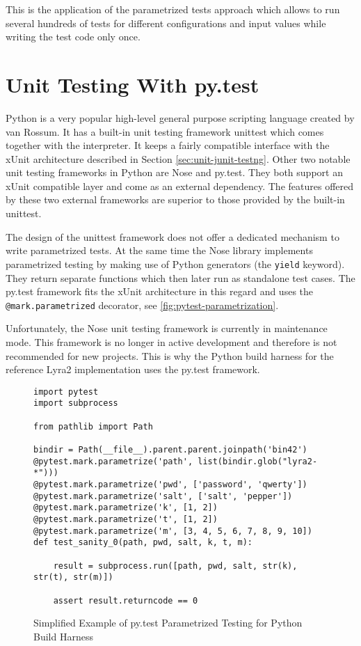 This is the application of the parametrized tests approach which allows to run several hundreds of tests for different configurations and input values while writing the test code only once.

\section{Unit Testing With py.test}
\label{sec:unit-pytest}

Python is a very popular high-level general purpose scripting language created by van Rossum. It has a built-in unit testing framework unittest which comes together with the interpreter. It keeps a fairly compatible interface with the xUnit architecture described in Section \ref{sec:unit-junit-testng}. Other two notable unit testing frameworks in Python are Nose and py.test. They both support an xUnit compatible layer and come as an external dependency. The features offered by these two external frameworks are superior to those provided by the built-in unittest.

The design of the unittest framework does not offer a dedicated mechanism to write parametrized tests. At the same time the Nose library implements parametrized testing by making use of Python generators (the \texttt{yield} keyword). They return separate functions which then later run as standalone test cases. The py.test framework fits the xUnit architecture in this regard and uses the \texttt{@mark.parametrized} decorator, see \autoref{fig:pytest-parametrization}.

Unfortunately, the Nose unit testing framework is currently in maintenance mode. This framework is no longer in active development and therefore is not recommended for new projects. This is why the Python build harness for the reference Lyra2 implementation uses the py.test framework.

\begin{figure}
\begin{verbatim}
import pytest
import subprocess

from pathlib import Path

bindir = Path(__file__).parent.parent.joinpath('bin42')
@pytest.mark.parametrize('path', list(bindir.glob("lyra2-*")))
@pytest.mark.parametrize('pwd', ['password', 'qwerty'])
@pytest.mark.parametrize('salt', ['salt', 'pepper'])
@pytest.mark.parametrize('k', [1, 2])
@pytest.mark.parametrize('t', [1, 2])
@pytest.mark.parametrize('m', [3, 4, 5, 6, 7, 8, 9, 10])
def test_sanity_0(path, pwd, salt, k, t, m):

    result = subprocess.run([path, pwd, salt, str(k), str(t), str(m)])

    assert result.returncode == 0
\end{verbatim}
\caption{Simplified Example of py.test Parametrized Testing for Python Build Harness}
\label{fig:pytest-parametrization}
\end{figure}

